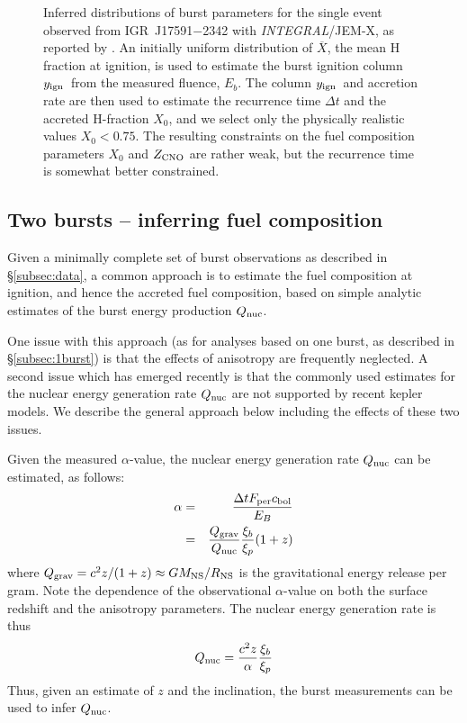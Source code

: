 \documentclass{aastex63}
\newcommand{\Xb}{\ensuremath{\overline{X}}}
\newcommand{\yign}{y_{\rm ign}}
\newcommand{\zcno}{Z_{\rm CNO}}
\newcommand{\igr}{{\it INTEGRAL}}
\begin{document}
\begin{figure}[ht!]
\caption{Inferred distributions of burst parameters for the single event observed from IGR~J17591$-$2342 with \igr/JEM-X, as reported by \cite{kuiper20}. An initially uniform distribution of \Xb, the mean H fraction at ignition, is used to estimate the burst ignition column $\yign$\ from the measured fluence, $E_b$. The column $\yign$\ and accretion rate are then used to estimate the recurrence time $\Delta t$ and the accreted H-fraction $X_0$, and we select only the physically realistic values $X_0<0.75$. The resulting constraints on the fuel composition parameters $X_0$ and $\zcno$ are rather weak, but the recurrence time is somewhat better constrained.
\label{fig:param_igr17591}}
\end{figure}

\subsection{Two bursts -- inferring fuel composition} 
\label{subsec:fuelcomp}

Given a minimally complete set of burst observations as described in \S\ref{subsec:data}, a common approach \cite[e.g][]{falanga11} is to estimate the fuel composition at ignition, and hence the accreted fuel composition, based on simple analytic estimates of the burst energy production $Q_{\rm nuc}$.

One issue with this approach (as for analyses based on one burst, as described in \S\ref{subsec:1burst}) is that the effects of anisotropy are frequently neglected.
%
A second issue which has emerged recently is that the commonly used estimates for the nuclear energy generation rate $Q_{\rm nuc}$ are not supported by recent {\sc kepler} models. 
%
We describe the general approach below including the effects of these two issues.

Given the measured $\alpha$-value, the nuclear energy generation rate $Q_{\rm nuc}$ can be estimated, as follows:
\begin{eqnarray}
\alpha & = & \frac{\Delta t F_{\rm per} c_{\rm bol}}{E_B} \\
& = & \frac{Q_{\rm grav}}{Q_{\rm nuc}}\frac{\xi_b}{\xi_p}(1+z)
\end{eqnarray}
where $Q_{\rm grav} = c^2z/(1+z) \approx GM_{\rm NS}/R_{\rm NS}$ is the gravitational energy release per gram. Note the dependence of the observational $\alpha$-value on both the surface redshift and the anisotropy parameters. The nuclear energy generation rate is thus
\begin{equation}
Q_{\rm nuc} = \frac{c^2 z}{\alpha}\frac{\xi_b}{\xi_p} \label{qnuc}
\end{equation}
Thus, given an estimate of $z$ and the inclination, the burst measurements can be used to infer $Q_{\rm nuc}$. 
\end{document}
